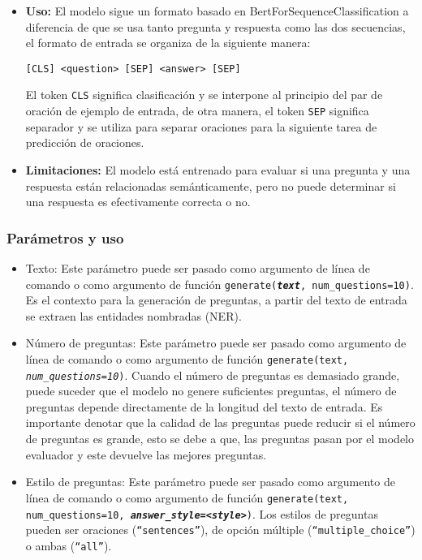 \documentclass[../Main.tex]{subfiles}
\begin{document}
\begin{itemize}
	 
 	\begin{itemize}
	    \item \textbf{Uso:} El modelo sigue un formato basado en BertForSequenceClassification a diferencia de que se usa tanto pregunta y respuesta como las dos secuencias, el formato de entrada se organiza de la siguiente manera:
	    
    	    \begin{center}
	            \texttt{[CLS] <question> [SEP] <answer> [SEP]}
	        \end{center}
    	    
	    	 El token \texttt{CLS} significa clasificación y se interpone al principio del par de oración de ejemplo de entrada, de otra manera, el token \texttt{SEP} significa separador y se utiliza para separar oraciones para la siguiente tarea de predicción de oraciones.
	
	    \item \textbf{Limitaciones:} El modelo está entrenado para evaluar si una pregunta y una respuesta están relacionadas semánticamente, pero no puede determinar si una respuesta es efectivamente correcta o no.
	\end{itemize}
	
\end{itemize}\par
    

    \subsubsection{Parámetros y uso}
    
    \begin{itemize}
        \item Texto: Este parámetro puede ser pasado como argumento de línea de comando o como argumento de función \texttt{generate(\textbf{\textit{text}}, num\_questions=10)}. Es el contexto para la generación de preguntas, a partir del texto de entrada se extraen las entidades nombradas (NER).
        
        \item Número de preguntas: Este parámetro puede ser pasado como argumento de línea de comando o como argumento de función \texttt{generate(text, \textit{num\_questions=10})}. Cuando el número de preguntas es demasiado grande, puede suceder que el modelo no genere suficientes preguntas, el número de preguntas depende directamente de la longitud del texto de entrada.
        Es importante denotar que la calidad de las preguntas puede reducir si el número de preguntas es grande, esto se debe a que, las preguntas pasan por el modelo evaluador y este devuelve las mejores preguntas.
        
        \item Estilo de preguntas: Este parámetro puede ser pasado como argumento de línea de comando o como argumento de función  \texttt{generate(text, num\_questions=10, \textbf{\textit{answer\_style=<style>}})}. Los estilos de preguntas pueden ser oraciones (\texttt{``sentences''}), de opción múltiple (\texttt{``multiple\_choice''}) o ambas (\texttt{``all''}).
    \end{itemize}
    
\end{document}
